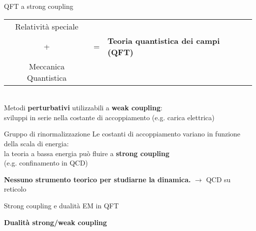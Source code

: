 \documentclass[10pt,compress,usenames,dvipsnames]{beamer}
\begin{document}
\begin{frame}{QFT a strong coupling}
\begin{tabular}{c l l }
Relatività speciale  & \\[0,1cm]
{\Large +} & {\Large=}  & \alert{\bfseries \large Teoria quantistica dei campi (QFT) }\\
Meccanica Quantistica & \\
\end{tabular}
\\
\vspace{0.3cm}
Metodi {\bfseries perturbativi} utilizzabili a \alert{\bfseries weak coupling}: \\
sviluppi in serie nella costante di accoppiamento (\small e.g.\alert { carica elettrica}) \\[0,4cm]

\begin{block}{Gruppo di rinormalizzazione}
Le costanti di accoppiamento variano in funzione della scala di energia:	\\
la teoria a bassa energia può fluire a \alert{\bfseries strong coupling} \\
(e.g. confinamento in QCD)
\end{block}

\alert{\bfseries Nessuno strumento teorico per studiarne la dinamica.}
$\longrightarrow$ QCD su reticolo

\end{frame}



\begin{frame}{Strong coupling e dualità EM in QFT}
\begin{center}
 \alert{\bfseries \Large Dualità strong/weak coupling}
\end{center}

\end{frame}
\end{document}
